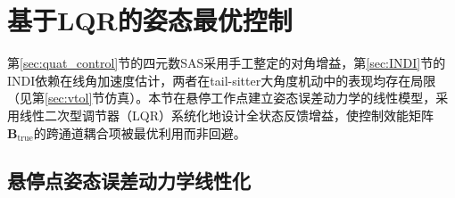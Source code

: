 \section{基于LQR的姿态最优控制}
\label{sec:lqr}

第\ref{sec:quat_control}节的四元数SAS采用手工整定的对角增益，第\ref{sec:INDI}节的INDI依赖在线角加速度估计，两者在tail-sitter大角度机动中的表现均存在局限（见第\ref{sec:vtol}节仿真）。本节在悬停工作点建立姿态误差动力学的线性模型，采用线性二次型调节器（LQR）系统化地设计全状态反馈增益，使控制效能矩阵$\mathbf{B}_{\mathrm{true}}$的跨通道耦合项被最优利用而非回避。

\subsection{悬停点姿态误差动力学线性化}
\label{sec:lqr_model}

